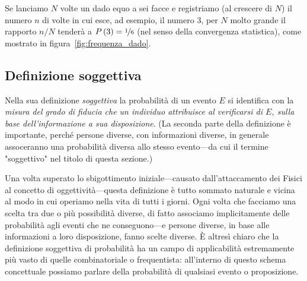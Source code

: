 \begin{examplebox}
  \begin{example}\label{example:prob_freq_one_die}
    Se lanciamo $N$ volte un dado equo a sei facce e registriamo (al crescere
    di $N$) il numero $n$ di volte in cui esce, ad esempio, il numero $3$, per
    $N$ molto grande il rapporto $n/N$ tenderà a $\displaystyle P\left(3\right) = \nicefrac{1}{6}$
    (nel senso della convergenza statistica), come mostrato in
    figura~\ref{fig:frequenza_dado}.
  \end{example}
\end{examplebox}



\subsection{Definizione soggettiva}

Nella sua definizione \emph{soggettiva} la probabilità di un evento $E$ si
identifica con la
\emph{misura del grado di fiducia che un individuo attribuisce al verificarsi
  di $E$, sulla base dell'informazione a sua disposizione}. (La seconda parte
della definizione è importante, perché persone diverse, con informazioni
diverse, in generale assoceranno una probabilità diversa allo stesso
evento---da cui il termine "soggettivo" nel titolo di questa sezione.)

Una volta superato lo sbigottimento iniziale---causato dall'attaccamento dei
Fisici al concetto di oggettività---questa definizione è tutto sommato
naturale e vicina al modo in cui operiamo nella vita di tutti i giorni. Ogni
volta che facciamo una scelta tra due o più possibilità diverse, di fatto
associamo implicitamente delle probabilità agli eventi che ne conseguono---e
persone diverse, in base alle informazioni a loro disposizione, fanno scelte
diverse. \`E altresì chiaro che la definizione soggettiva di probabilità ha
un campo di applicabilità estremamente più vasto di quelle combinatoriale o
frequentista: all'interno di questo schema concettuale possiamo parlare della
probabilità di qualsiasi evento o proposizione.

